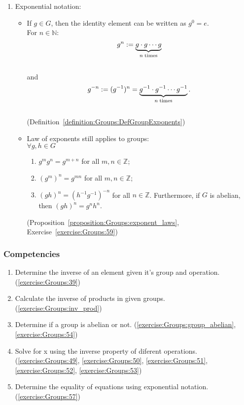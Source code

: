 \begin{enumerate}
\item
Exponential notation:
	\begin{itemize}
	\item
	If $g \in G$, then the identity element can be written as $g^0 = e$.\\
	For $n \in {\mathbb N}$:\\
	\[  	g^n := \underbrace{g \cdot g \cdots g}_{n \; {\rm times}} \]\\
	and\\
	\[g^{-n} := (g^{-1})^n =  \underbrace{g^{-1} \cdot g^{-1} \cdots g^{-1}}_{n \; {\rm times}}. \]\\
	(Definition~\ref{definition:Groups:DefGroupExponents})
	
	\item
	Law of exponents still applies to groups:\\
	$\forall g, h \in G$\\
		\begin{enumerate}
 		\item
		$g^mg^n = g^{m+n}$ for all $m, n \in {\mathbb Z}$; 
 
		\item
		$(g^m)^n = g^{mn}$ for all $m, n \in {\mathbb Z}$; 
 
		\item
		$(gh)^n = (h^{-1}g^{-1})^{-n}$ for all $n \in {\mathbb Z}$. Furthermore, if $G$ is abelian, then $(gh)^n = g^nh^n$. 
 		\end{enumerate}
	(Proposition~\ref{proposition:Groups:exponent_laws}, Exercise~\ref{exercise:Groups:59})
	\end{itemize}
\end{enumerate}

\subsubsection*{Competencies}
\begin{enumerate}
\item
Determine the inverse of an element given it's group and operation. (\ref{exercise:Groups:39})

\item
Calculate the inverse of products in given groups. (\ref{exercise:Groups:inv_prod})

\item
Determine if a group is abelian or not. (\ref{exercise:Groups:group_abelian}, \ref{exercise:Groups:54})

\item
Solve for x using the inverse property of diferent operations. (\ref{exercise:Groups:49}, \ref{exercise:Groups:50}, \ref{exercise:Groups:51}, \ref{exercise:Groups:52}, \ref{exercise:Groups:53})

\item
Determine the equality of equations using exponential notation. (\ref{exercise:Groups:57})
\end{enumerate}


